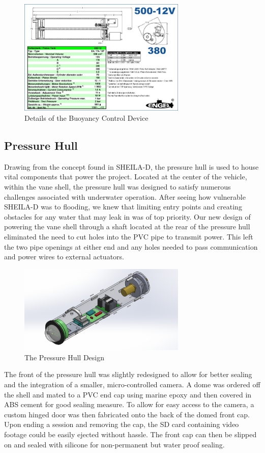 \documentclass{report}
\begin{document}
\begin{figure}[h]
\centering
\includegraphics[width=8cm]{bcDetails}
\caption{Details of the Buoyancy Control Device}
\end{figure}
\subsection{Pressure Hull}
Drawing from the concept found in SHEILA-D, the pressure hull is used to house vital components that power the project.  Located at the center of the vehicle, within the vane shell, the pressure hull was designed to satisfy numerous challenges associated with underwater operation.  After seeing how vulnerable SHEILA-D was to flooding, we knew that limiting entry points and creating obstacles for any water that may leak in was of top priority.  Our new design of powering the vane shell through a shaft located at the rear of the pressure hull eliminated the need to cut holes into the PVC pipe to transmit power.  This left the two pipe openings at either end and any holes needed to pass communication and power wires to external actuators.
\begin{figure}[h]
\centering
\includegraphics[width=8cm]{"Pressure Hull"}
\caption{The Pressure Hull Design}
\end{figure}
The front of the pressure hull was slightly redesigned to allow for better sealing and the integration of a smaller, micro-controlled camera.  A dome was ordered off the shell and mated to a PVC end cap using marine epoxy and then covered in ABS cement for good sealing measure.  To allow for easy access to the camera, a custom hinged door was then fabricated onto the back of the domed front cap.  Upon ending a session and removing the cap, the SD card containing video footage could be easily ejected without hassle.  The front cap can then be slipped on and sealed with silicone for non-permanent but water proof sealing.
\end{document}
